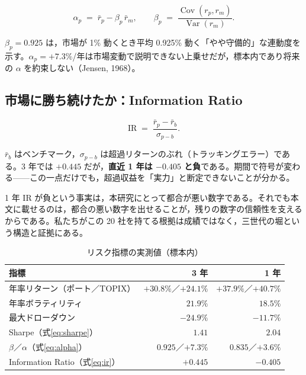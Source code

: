 \documentclass[a4paper,10pt]{article}
\newcommand{\metric}[1]{\mathrm{#1}}
\begin{document}
\begin{equation}
\alpha_p \;=\; \bar r_p - \beta_p\,\bar r_m,
\qquad
\beta_p \;=\; \frac{\operatorname{Cov}(r_p, r_m)}{\operatorname{Var}(r_m)}.
\label{eq:alpha}
\end{equation}

$\beta_p=0.925$ は，市場が 1\% 動くとき平均 0.925\% 動く「やや守備的」な連動度を示す。$\alpha_p=+7.3\%$/年は市場変動で説明できない上乗せだが，標本内であり将来の $\alpha$ を約束しない（Jensen, 1968）。

\subsection{市場に勝ち続けたか：Information Ratio}

\begin{equation}
\metric{IR} \;=\; \frac{\bar r_p - \bar r_b}{\sigma_{p-b}}.
\label{eq:ir}
\end{equation}

$\bar r_b$ はベンチマーク，$\sigma_{p-b}$ は超過リターンのぶれ（トラッキングエラー）である。3 年では $+0.445$ だが，\textbf{直近 1 年は $-0.405$ と負}である。期間で符号が変わる——この一点だけでも，超過収益を「実力」と断定できないことが分かる。

\begin{defbox}
1 年 IR が負という事実は，本研究にとって都合が悪い数字である。それでも本文に載せるのは，都合の悪い数字を出せることが，残りの数字の信頼性を支えるからである。私たちがこの 20 社を持てる根拠は成績ではなく，三世代の堀という構造と証拠にある。
\end{defbox}

\begin{table}[H]
\caption{リスク指標の実測値（標本内）}
\centering
\small
\begin{tabular}{lrr}
\toprule
指標 & 3 年 & 1 年 \\
\midrule
年率リターン（ポート／TOPIX） & $+30.8\%$／$+24.1\%$ & $+37.9\%$／$+40.7\%$ \\
年率ボラティリティ & $21.9\%$ & $18.5\%$ \\
最大ドローダウン & $-24.9\%$ & $-11.7\%$ \\
Sharpe（式\eqref{eq:sharpe}） & $1.41$ & $2.04$ \\
$\beta$／$\alpha$（式\eqref{eq:alpha}） & $0.925$／$+7.3\%$ & $0.835$／$+3.6\%$ \\
Information Ratio（式\eqref{eq:ir}） & $+0.445$ & $\mathbf{-0.405}$ \\
\bottomrule
\end{tabular}
\end{table}
\end{document}
